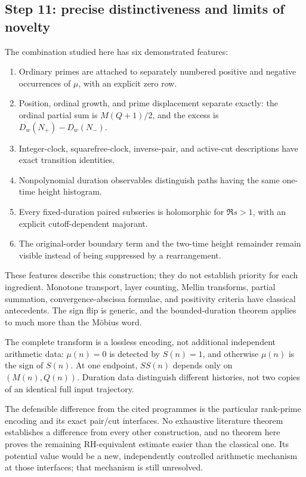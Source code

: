 \documentclass[11pt]{amsart}
\numberwithin{equation}{section}
\theoremstyle{plain}
\theoremstyle{definition}
\theoremstyle{remark}
\begin{document}
\subsection{Step 11: precise distinctiveness and limits of novelty}
\label{subsec:a12-distinctiveness}
The combination studied here has six demonstrated features:
\begin{enumerate}[label=(\roman*),leftmargin=*]
\item Ordinary primes are attached to separately numbered positive and
negative occurrences of $\mu$, with an explicit zero row.
\item Position, ordinal growth, and prime displacement separate exactly:
the ordinal partial sum is $M(Q+1)/2$, and the excess is
$D_w(N_+)-D_w(N_-)$.
\item Integer-clock, squarefree-clock, inverse-pair, and active-cut
descriptions have exact transition identities.
\item Nonpolynomial duration observables distinguish paths having the
same one-time height histogram.
\item Every fixed-duration paired subseries is holomorphic for $\Re s>1$,
with an explicit cutoff-dependent majorant.
\item The original-order boundary term and the two-time height remainder
remain visible instead of being suppressed by a rearrangement.
\end{enumerate}

These features describe this construction; they do not establish priority
for each ingredient. Monotone transport, layer counting, Mellin transforms,
partial summation, convergence-abscissa formulae, and positivity criteria
have classical antecedents. The sign flip is generic, and the
bounded-duration theorem applies to much more than the M\"obius word.

The complete transform is a lossless encoding, not additional independent
arithmetic data: $\mu(n)=0$ is detected by $S(n)=1$, and otherwise $\mu(n)$
is the sign of $S(n)$. At one endpoint, $SS(n)$ depends only on $(M(n),Q(n))$.
Duration data distinguish different histories, not two copies of an
identical full input trajectory.

The defensible difference from the cited programmes is the particular
rank-prime encoding and its exact pair/cut interfaces.
No exhaustive literature theorem establishes a difference from every other
construction, and no theorem here proves the remaining RH-equivalent
estimate easier than the classical one. Its potential value would be a
new, independently controlled arithmetic mechanism at those interfaces;
that mechanism is still unresolved.
\end{document}
